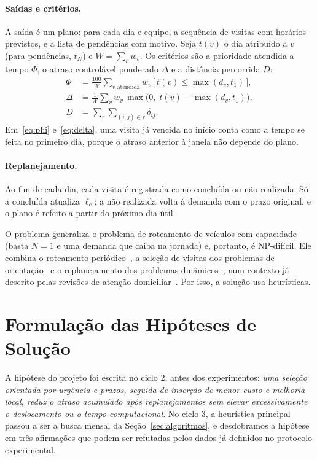 \documentclass[11pt,a4paper]{article}
\begin{document}
\paragraph{Saídas e critérios.} A saída é um plano: para cada dia e equipe, a sequência de visitas com horários previstos, e a lista de pendências com motivo. Seja $t(v)$ o dia atribuído a $v$ (para pendências, $t_N$) e $W = \sum_v w_v$. Os critérios são a prioridade atendida a tempo $\Phi$, o atraso controlável ponderado $\Delta$ e a distância percorrida $D$:
\begin{align}
  \Phi &= \frac{100}{W} \sum_{v \text{ atendida}} w_v \, \bigl[\, t(v) \le \max(d_v, t_1) \,\bigr], \label{eq:phi}\\
  \Delta &= \frac{1}{W}\sum_{v} w_v \, \max\bigl(0,\; t(v) -
\max(d_v, t_1)\bigr), \label{eq:delta}\\
  D &= \textstyle\sum_{r}\sum_{(i,j)\in r} \delta_{ij}. \label{eq:dist}
\end{align}
Em~\eqref{eq:phi} e~\eqref{eq:delta}, uma visita já vencida no início conta como a tempo se feita no primeiro dia, porque o atraso anterior à janela não depende do plano.

\paragraph{Replanejamento.} Ao fim de cada dia, cada visita é registrada como concluída ou não realizada. Só a concluída atualiza $\ell_c$; a não realizada volta à demanda com o prazo original, e o plano é refeito a partir do próximo dia útil.

O problema generaliza o problema de roteamento de veículos com capacidade~\cite{dantzig1959,toth2014} (basta $N=1$ e uma demanda que caiba na jornada) e, portanto, é NP-difícil. Ele combina o roteamento periódico~\cite{campbell2014}, a seleção de visitas dos problemas de orientação~\cite{vansteenwegen2011} e o replanejamento dos problemas dinâmicos~\cite{pillac2013}, num contexto já descrito pelas revisões de atenção domiciliar~\cite{fikar2017,cisse2017}. Por isso, a solução usa heurísticas.

\section{Formulação das Hipóteses de Solução}

A hipótese do projeto foi escrita no ciclo 2, antes dos experimentos: \emph{uma seleção orientada por urgência e prazos, seguida de inserção de menor custo e melhoria local, reduz o atraso acumulado após replanejamentos sem elevar excessivamente o deslocamento ou o tempo computacional}. No ciclo 3, a heurística principal passou a ser a busca mensal da Seção~\ref{sec:algoritmos}, e desdobramos a hipótese em três afirmações que podem ser refutadas pelos dados já definidos no protocolo experimental.
\end{document}

